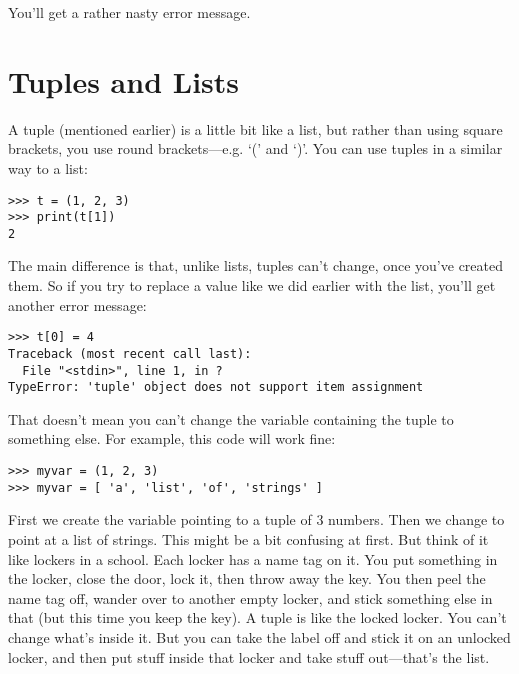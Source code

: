 \noindent
You'll get a rather nasty error message.

\section{Tuples and Lists}\label{tuplesandlists}

A tuple (mentioned earlier) is a little bit like a list, but rather than using square brackets, you use round brackets---e.g. `(' and `)'.  You can use tuples in a similar way to a list:

\begin{listing}
\begin{verbatim}
>>> t = (1, 2, 3)
>>> print(t[1])
2
\end{verbatim}
\end{listing}

The main difference is that, unlike lists, tuples can't change, once you've created them.  So if you try to replace a value like we did earlier with the list, you'll get another error message:

\begin{listing}
\begin{verbatim}
>>> t[0] = 4
Traceback (most recent call last):
  File "<stdin>", line 1, in ?
TypeError: 'tuple' object does not support item assignment
\end{verbatim}
\end{listing}

That doesn't mean you can't change the variable containing the tuple to something else.  For example, this code will work fine:

\begin{listing}
\begin{verbatim}
>>> myvar = (1, 2, 3)
>>> myvar = [ 'a', 'list', 'of', 'strings' ]
\end{verbatim}
\end{listing}

First we create the variable  pointing to a tuple of 3 numbers.  Then we change  to point at a list of strings. This might be a bit confusing at first.  But think of it like lockers in a school.  Each locker has a name tag on it. You put something in the locker, close the door, lock it, then throw away the key.  You then peel the name tag off, wander over to another empty locker, and stick something else in that (but this time you keep the key).  A tuple is like the locked locker.  You can't change what's inside it.  But you can take the label off and stick it on an unlocked locker, and then put stuff inside that locker and take stuff out---that's the list.

